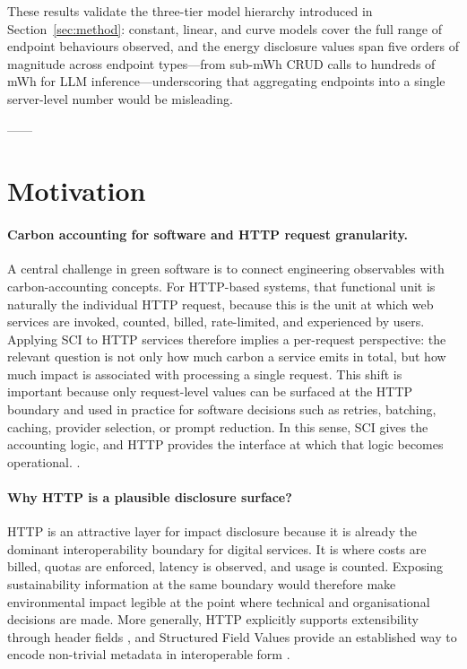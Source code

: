 These results validate the three-tier model hierarchy introduced in Section~\ref{sec:method}: constant, linear, and curve models cover the full range of endpoint behaviours observed, and the energy disclosure values span five orders of magnitude across endpoint types---from sub-mWh CRUD calls to hundreds of mWh for LLM inference---underscoring that aggregating endpoints into a single server-level number would be misleading.


------


\section{Motivation}

\paragraph{Carbon accounting for software and HTTP request granularity.}
A central challenge in green software is to connect engineering observables with carbon-accounting concepts.  For HTTP-based systems, that functional unit is naturally the individual HTTP request, because this is the unit at which web services are invoked, counted, billed, rate-limited, and experienced by users. Applying SCI to HTTP services therefore implies a per-request perspective: the relevant question is not only how much carbon a service emits in total, but how much impact is associated with processing a single request. This shift is important because only request-level values can be surfaced at the HTTP boundary and used in practice for software decisions such as retries, batching, caching, provider selection, or prompt reduction. In this sense, SCI gives the accounting logic, and HTTP provides the interface at which that logic becomes operational. \cite{kern2015impacts,lago2015framing,verdecchia2021green}.

\paragraph{Why HTTP is a plausible disclosure surface?}
HTTP is an attractive layer for impact disclosure because it is already the dominant interoperability boundary for digital services. It is where costs are billed, quotas are enforced, latency is observed, and usage is counted. Exposing sustainability information at the same boundary would therefore make environmental impact legible at the point where technical and organisational decisions are made. More generally, HTTP explicitly supports extensibility through header fields \cite{rfc9110}, and Structured Field Values provide an established way to encode non-trivial metadata in interoperable form \cite{rfc8941}.

